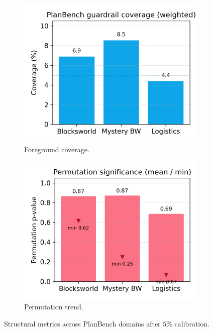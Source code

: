 \documentclass[11pt]{article}
\begin{document}
\begin{figure}[h]
  \begin{subfigure}[t]{0.45\textwidth}
    \centering
    \includegraphics[width=\textwidth]{figures/planbench_guardrail.png}
    \caption{Foreground coverage.}
  \end{subfigure}\hfill
  \begin{subfigure}[t]{0.45\textwidth}
    \centering
    \includegraphics[width=\textwidth]{figures/planbench_permutation.png}
    \caption{Permutation trend.}
  \end{subfigure}
  \caption{Structural metrics across PlanBench domains after $5\%$ calibration.}
  \label{fig:planbench-metrics}
\end{figure}
\end{document}
